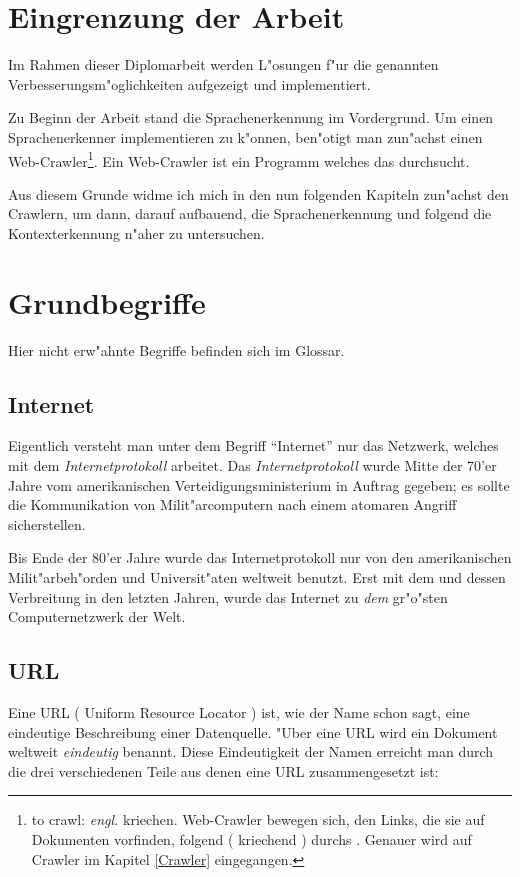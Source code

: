 \section{Eingrenzung der Arbeit}
Im Rahmen dieser Diplomarbeit werden L"osungen f"ur die genannten Verbesserungsm"oglichkeiten aufgezeigt und implementiert.

Zu Beginn der Arbeit stand die Sprachenerkennung im Vordergrund. Um einen Sprachenerkenner implementieren zu k"onnen, ben"otigt man zun"achst einen Web-Crawler\footnote{to crawl: {\em engl.} kriechen. Web-Crawler bewegen sich, den Links, die sie auf Dokumenten vorfinden, folgend ( kriechend ) durchs \www . Genauer wird auf Crawler im Kapitel \ref{Crawler} eingegangen.}. Ein Web-Crawler ist ein Programm welches das \www durchsucht.

Aus diesem Grunde widme ich mich in den nun folgenden Kapiteln zun"achst den Crawlern, um dann, darauf aufbauend, die Sprachenerkennung und folgend die Kontexterkennung n"aher zu untersuchen.





\section{Grundbegriffe}

Hier nicht erw"ahnte Begriffe befinden sich im Glossar.

\subsection{Internet}
Eigentlich versteht man unter dem Begriff "`Internet"' nur das Netzwerk, welches mit dem {\em Internetprotokoll} arbeitet. Das {\em Internetprotokoll} wurde Mitte der 70'er Jahre vom amerikanischen Verteidigungsministerium in Auftrag gegeben; es sollte die Kommunikation von Milit"arcomputern nach einem atomaren Angriff sicherstellen.

Bis Ende der 80'er Jahre wurde das Internetprotokoll nur von den amerikanischen Milit"arbeh"orden und Universit"aten weltweit benutzt. Erst mit dem \www und dessen Verbreitung in den letzten Jahren, wurde das Internet zu {\em dem} gr"o"sten Computernetzwerk der Welt.


\subsection{URL}
Eine URL ( Uniform Resource Locator ) ist, wie der Name schon sagt, eine eindeutige Beschreibung einer Datenquelle. "Uber eine URL wird ein Dokument weltweit {\em eindeutig} benannt. Diese Eindeutigkeit der Namen erreicht man durch die drei verschiedenen Teile aus denen eine URL zusammengesetzt ist:


